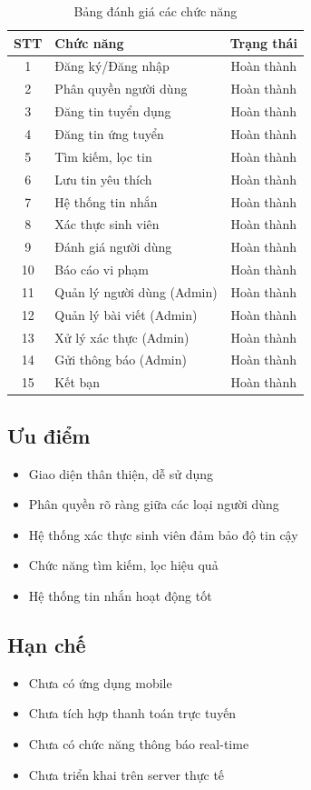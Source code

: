 \documentclass[a4paper,12pt]{report}
\begin{document}
\begin{table}[H]
\centering
\caption{Bảng đánh giá các chức năng}
\begin{tabular}{|c|l|c|}
\hline
\textbf{STT} & \textbf{Chức năng} & \textbf{Trạng thái} \\
\hline
1 & Đăng ký/Đăng nhập & Hoàn thành \\
2 & Phân quyền người dùng & Hoàn thành \\
3 & Đăng tin tuyển dụng & Hoàn thành \\
4 & Đăng tin ứng tuyển & Hoàn thành \\
5 & Tìm kiếm, lọc tin & Hoàn thành \\
6 & Lưu tin yêu thích & Hoàn thành \\
7 & Hệ thống tin nhắn & Hoàn thành \\
8 & Xác thực sinh viên & Hoàn thành \\
9 & Đánh giá người dùng & Hoàn thành \\
10 & Báo cáo vi phạm & Hoàn thành \\
11 & Quản lý người dùng (Admin) & Hoàn thành \\
12 & Quản lý bài viết (Admin) & Hoàn thành \\
13 & Xử lý xác thực (Admin) & Hoàn thành \\
14 & Gửi thông báo (Admin) & Hoàn thành \\
15 & Kết bạn & Hoàn thành \\
\hline
\end{tabular}
\end{table}

\subsection{Ưu điểm}
\begin{itemize}
    \item Giao diện thân thiện, dễ sử dụng
    \item Phân quyền rõ ràng giữa các loại người dùng
    \item Hệ thống xác thực sinh viên đảm bảo độ tin cậy
    \item Chức năng tìm kiếm, lọc hiệu quả
    \item Hệ thống tin nhắn hoạt động tốt
\end{itemize}

\subsection{Hạn chế}
\begin{itemize}
    \item Chưa có ứng dụng mobile
    \item Chưa tích hợp thanh toán trực tuyến
    \item Chưa có chức năng thông báo real-time
    \item Chưa triển khai trên server thực tế
\end{itemize}
\end{document}
